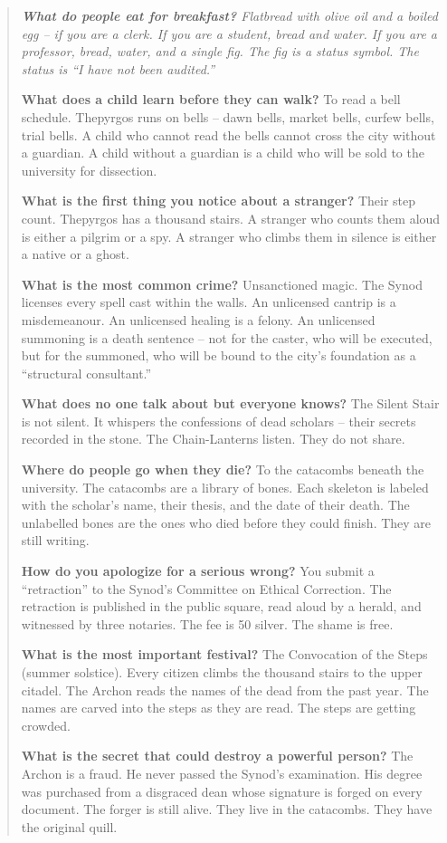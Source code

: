 \documentclass[12pt,oneside]{book}
\newenvironment{almanac}
  {\begin{quote}\small\itshape}
  {\end{quote}}
\begin{document}
\vspace{1em}
\begin{almanac}
\textbf{What do people eat for breakfast?} Flatbread with olive oil and a boiled egg -- if you are a clerk. If you are a student, bread and water. If you are a professor, bread, water, and a single fig. The fig is a status symbol. The status is ``I have not been audited.''

\textbf{What does a child learn before they can walk?} To read a bell schedule. Thepyrgos runs on bells -- dawn bells, market bells, curfew bells, trial bells. A child who cannot read the bells cannot cross the city without a guardian. A child without a guardian is a child who will be sold to the university for dissection.

\textbf{What is the first thing you notice about a stranger?} Their step count. Thepyrgos has a thousand stairs. A stranger who counts them aloud is either a pilgrim or a spy. A stranger who climbs them in silence is either a native or a ghost.

\textbf{What is the most common crime?} Unsanctioned magic. The Synod licenses every spell cast within the walls. An unlicensed cantrip is a misdemeanour. An unlicensed healing is a felony. An unlicensed summoning is a death sentence -- not for the caster, who will be executed, but for the summoned, who will be bound to the city's foundation as a ``structural consultant.''

\textbf{What does no one talk about but everyone knows?} The Silent Stair is not silent. It whispers the confessions of dead scholars -- their secrets recorded in the stone. The Chain-Lanterns listen. They do not share.

\textbf{Where do people go when they die?} To the catacombs beneath the university. The catacombs are a library of bones. Each skeleton is labeled with the scholar's name, their thesis, and the date of their death. The unlabelled bones are the ones who died before they could finish. They are still writing.

\textbf{How do you apologize for a serious wrong?} You submit a ``retraction'' to the Synod's Committee on Ethical Correction. The retraction is published in the public square, read aloud by a herald, and witnessed by three notaries. The fee is 50 silver. The shame is free.

\textbf{What is the most important festival?} The Convocation of the Steps (summer solstice). Every citizen climbs the thousand stairs to the upper citadel. The Archon reads the names of the dead from the past year. The names are carved into the steps as they are read. The steps are getting crowded.

\textbf{What is the secret that could destroy a powerful person?} The Archon is a fraud. He never passed the Synod's examination. His degree was purchased from a disgraced dean whose signature is forged on every document. The forger is still alive. They live in the catacombs. They have the original quill.
\end{almanac}
\end{document}
